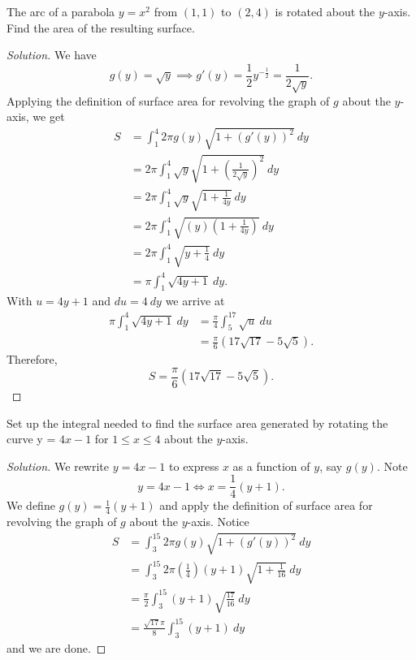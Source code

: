 \documentclass[compacto,10pt,comentarios]{aleph-notas}
\begin{document}
\begin{ejer}
    The arc of a parabola $y = x ^ {2}$ from $(1, 1)$ to $(2, 4)$ is rotated about the $y$-axis. Find the area of the resulting surface.
\end{ejer}
\begin{proof}[Solution]
    We have
    $$
        g(y) = \sqrt{y} \implies g'(y) = \frac{1}{2} y^{-\frac{1}{2}} = \frac{1}{2\sqrt{y}}.
    $$
    Applying the definition of surface area for revolving the graph of $g$ about the $y$-axis, we get
    \begin{align*}
        S & = \int_{1}^{4} 2 \pi g(y) \sqrt{1 + (g'(y)) ^ {2}} ~ dy \\
        & = 2 \pi \int_{1}^{4} \sqrt{y} \sqrt{1 + \left( \frac{1}{2\sqrt{y}} \right)^{2}} ~ dy \\
        & = 2 \pi \int_{1}^{4} \sqrt{y} \sqrt{1 + \frac{1}{4y}} ~ dy \\
        & = 2 \pi \int_{1}^{4} \sqrt{\left( y \right) \left(1 + \frac{1}{4y} \right)} ~ dy \\
        & = 2 \pi \int_{1}^{4} \sqrt{y + \frac{1}{4}} ~ dy \\
        & = \pi \int_{1}^{4} \sqrt{4y + 1} ~ dy .
    \end{align*}
    With $u = 4y + 1$ and $du = 4 ~ dy$ we arrive at
    \begin{align*}
        \pi \int_{1}^{4} \sqrt{4y + 1} ~ dy & = \frac{\pi}{4} \int_{5}^{17} \sqrt{u} ~ du \\
        & = \frac{\pi}{6} \left(17 \sqrt{17} - 5\sqrt{5} \right) .
    \end{align*}
    Therefore,
    $$
    S = \frac{\pi}{6} \left(17 \sqrt{17} - 5\sqrt{5} \right) .
    $$
\end{proof}

\begin{ejer}
    Set up the integral needed to find the surface area generated by rotating the curve y = $4x - 1$ for $1 \leq x \leq 4$ about the $y$-axis.
\end{ejer}
\begin{proof}[Solution]
    We rewrite $y=4x - 1$ to express $x$ as a function of $y$, say $g(y)$. Note
    $$
        y = 4x - 1 \iff x = \frac{1}{4} \left(y + 1\right).
    $$
    We define $g(y) = \frac{1}{4} (y + 1)$ and apply the definition of surface area for revolving the graph of $g$ about the $y$-axis. Notice
    \begin{align*}
        S & = \int_{3}^{15} 2\pi g(y) \sqrt{1 + \left(g'(y)\right)^{2}} ~ dy \\
        & = \int_{3}^{15} 2 \pi \left(\frac{1}{4}\right) \left( y + 1 \right) \sqrt{1 + \frac{1}{16}} ~ dy \\
        & =  \frac{\pi}{2} \int_{3}^{15} \left( y + 1 \right) \sqrt{\frac{17}{16}} ~ dy \\
        & =  \frac{\sqrt{17}\pi}{8} \int_{3}^{15} \left( y + 1 \right) ~ dy
    \end{align*}
    and we are done.
\end{proof}
\end{document}
